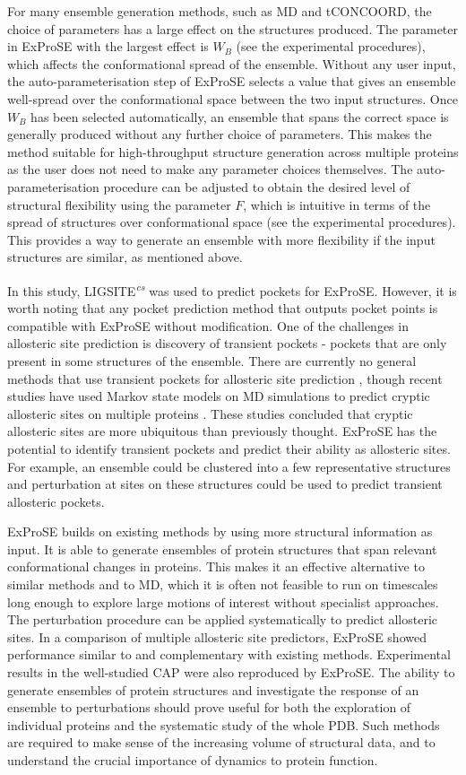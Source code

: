 For many ensemble generation methods, such as MD and tCONCOORD, the choice of parameters has a large effect on the structures produced.
The parameter in ExProSE with the largest effect is $W_{B}$ (see the experimental procedures), which affects the conformational spread of the ensemble.
Without any user input, the auto-parameterisation step of ExProSE selects a value that gives an ensemble well-spread over the conformational space between the two input structures.
Once $W_{B}$ has been selected automatically, an ensemble that spans the correct space is generally produced without any further choice of parameters.
This makes the method suitable for high-throughput structure generation across multiple proteins as the user does not need to make any parameter choices themselves.
The auto-parameterisation procedure can be adjusted to obtain the desired level of structural flexibility using the parameter $F$, which is intuitive in terms of the spread of structures over conformational space (see the experimental procedures).
This provides a way to generate an ensemble with more flexibility if the input structures are similar, as mentioned above.

In this study, LIGSITE\textsuperscript{\it cs} was used to predict pockets for ExProSE.
However, it is worth noting that any pocket prediction method that outputs pocket points is compatible with ExProSE without modification.
One of the challenges in allosteric site prediction is discovery of transient pockets - pockets that are only present in some structures of the ensemble.
There are currently no general methods that use transient pockets for allosteric site prediction \cite{Boehr2009}, though recent studies have used Markov state models on MD simulations to predict cryptic allosteric sites on multiple proteins \cite{Bowman2012, Bowman2015}.
These studies concluded that cryptic allosteric sites are more ubiquitous than previously thought.
ExProSE has the potential to identify transient pockets and predict their ability as allosteric sites.
For example, an ensemble could be clustered into a few representative structures and perturbation at sites on these structures could be used to predict transient allosteric pockets.

ExProSE builds on existing methods by using more structural information as input.
It is able to generate ensembles of protein structures that span relevant conformational changes in proteins.
This makes it an effective alternative to similar methods and to MD, which it is often not feasible to run on timescales long enough to explore large motions of interest without specialist approaches.
The perturbation procedure can be applied systematically to predict allosteric sites.
In a comparison of multiple allosteric site predictors, ExProSE showed performance similar to and complementary with existing methods.
Experimental results in the well-studied CAP were also reproduced by ExProSE.
The ability to generate ensembles of protein structures and investigate the response of an ensemble to perturbations should prove useful for both the exploration of individual proteins and the systematic study of the whole PDB.
Such methods are required to make sense of the increasing volume of structural data, and to understand the crucial importance of dynamics to protein function.
